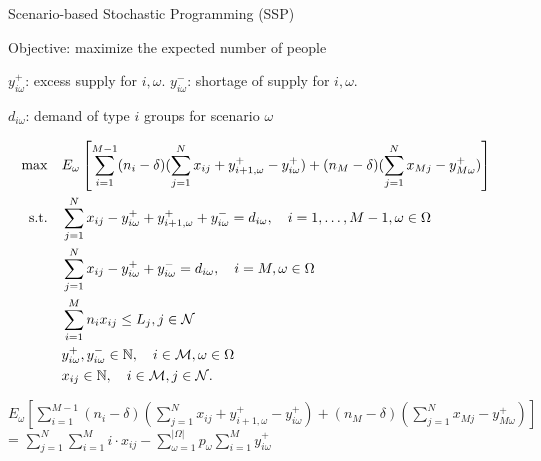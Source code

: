     \begin{frame}{Scenario-based Stochastic Programming (SSP)}
      \begin{scriptsize}
        Objective: maximize the expected number of people

        $y_{i \omega}^{+}$: excess supply for $i, \omega$. $y_{i \omega}^{-}$: shortage of supply for $i, \omega$.

        $d_{i \omega}$: demand of type $i$ groups for scenario $\omega$

      \begin{equation}
        \begin{aligned}
        \hspace{-10mm}
        \max \quad & E_{\omega}\left[\sum_{i=1}^{M-1} (n_i-\delta) (\sum_{j= 1}^{N} x_{ij} + y_{i+1,\omega}^{+} - y_{i \omega}^{+}) + (n_{M}-\delta) (\sum_{j= 1}^{N} x_{Mj} - y_{M \omega}^{+})\right] \\
        \text {s.t.} \quad & \sum_{j= 1}^{N} x_{ij}-y_{i \omega}^{+}+
        y_{i+1, \omega}^{+} + y_{i \omega}^{-}=d_{i \omega}, \quad i = 1,\ldots,M-1, \omega \in \Omega \\
        & \sum_{j= 1}^{N} x_{ij} -y_{i \omega}^{+}+y_{i \omega}^{-}=d_{i \omega}, \quad i = M, \omega \in \Omega \\
        & \sum_{i=1}^{M} n_{i} x_{ij} \leq L_j, j \in \mathcal{N}\\
        & y_{i \omega}^{+}, y_{i \omega}^{-} \in \mathbb{N}, \quad i \in \mathcal{M}, \omega \in \Omega \\
        & x_{ij} \in \mathbb{N}, \quad i \in \mathcal{M}, j \in \mathcal{N}.
        \end{aligned}
      \end{equation}
      \end{scriptsize}

      \begin{tiny}
        $E_{\omega}\left[\sum_{i=1}^{M-1} (n_i-\delta) (\sum_{j= 1}^{N} x_{ij} + y_{i+1,\omega}^{+} - y_{i \omega}^{+}) + (n_{M}-\delta) (\sum_{j= 1}^{N} x_{Mj} - y_{M \omega}^{+})\right]$ = $\sum_{j =1}^{N} \sum_{i=1}^M i \cdot x_{ij} - \sum_{\omega =1}^{|\Omega|} p_{\omega} \sum_{i = 1}^{M} y_{i \omega}^{+}$
      \end{tiny}
    \end{frame}

